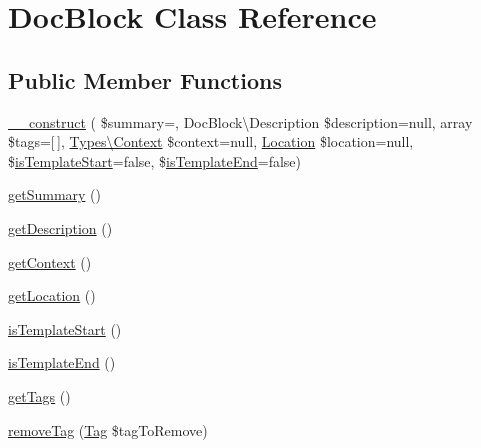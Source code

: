 \hypertarget{classphp_documentor_1_1_reflection_1_1_doc_block}{}\section{Doc\+Block Class Reference}
\label{classphp_documentor_1_1_reflection_1_1_doc_block}
\subsection*{Public Member Functions}
\begin{DoxyCompactItemize}
\item 
\mbox{\hyperlink{classphp_documentor_1_1_reflection_1_1_doc_block_a228b4fa3e26efcb1707173b7b7ef88a7}{\+\_\+\+\_\+construct}} ( \$summary=\textquotesingle{}\textquotesingle{}, Doc\+Block\textbackslash{}\+Description \$description=null, array \$tags=\mbox{[}$\,$\mbox{]}, \mbox{\hyperlink{classphp_documentor_1_1_reflection_1_1_types_1_1_context}{Types\textbackslash{}\+Context}} \$context=null, \mbox{\hyperlink{classphp_documentor_1_1_reflection_1_1_location}{Location}} \$location=null, \$\mbox{\hyperlink{classphp_documentor_1_1_reflection_1_1_doc_block_a98bb0c3ca0dfd8c974980e05af0a4432}{is\+Template\+Start}}=false, \$\mbox{\hyperlink{classphp_documentor_1_1_reflection_1_1_doc_block_a3a1994a874edbd0ca71db5645acc1944}{is\+Template\+End}}=false)
\item 
\mbox{\hyperlink{classphp_documentor_1_1_reflection_1_1_doc_block_aa70e0b18c67bbedbc87d3d835bd5dc57}{get\+Summary}} ()
\item 
\mbox{\hyperlink{classphp_documentor_1_1_reflection_1_1_doc_block_a2e7bb35c71bf1824456ceb944cb7a845}{get\+Description}} ()
\item 
\mbox{\hyperlink{classphp_documentor_1_1_reflection_1_1_doc_block_a51609a8c7faaf9948679e3a291ba4733}{get\+Context}} ()
\item 
\mbox{\hyperlink{classphp_documentor_1_1_reflection_1_1_doc_block_a270a747ff748def87f313beeef64f3b3}{get\+Location}} ()
\item 
\mbox{\hyperlink{classphp_documentor_1_1_reflection_1_1_doc_block_a98bb0c3ca0dfd8c974980e05af0a4432}{is\+Template\+Start}} ()
\item 
\mbox{\hyperlink{classphp_documentor_1_1_reflection_1_1_doc_block_a3a1994a874edbd0ca71db5645acc1944}{is\+Template\+End}} ()
\item 
\mbox{\hyperlink{classphp_documentor_1_1_reflection_1_1_doc_block_ae07173ab06a20e2f5bd928cc0518e01f}{get\+Tags}} ()
\item 
\mbox{\hyperlink{classphp_documentor_1_1_reflection_1_1_doc_block_a64cf2a1793b4e644969b1ae53e272a4a}{remove\+Tag}} (\mbox{\hyperlink{interfacephp_documentor_1_1_reflection_1_1_doc_block_1_1_tag}{Tag}} \$tag\+To\+Remove)
\end{DoxyCompactItemize}


